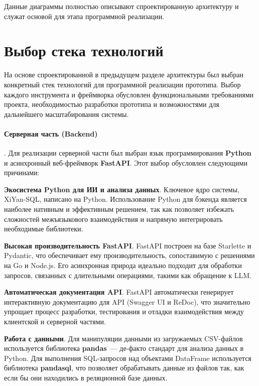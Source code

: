 Данные диаграммы полностью описывают спроектированную архитектуру и
служат основой для этапа программной реализации.




\section{Выбор стека технологий}

На основе спроектированной в предыдущем разделе архитектуры был выбран конкретный стек
технологий для программной реализации прототипа. Выбор каждого инструмента и фреймворка
обусловлен функциональными требованиями проекта, необходимостью разработки прототипа и
возможностями для дальнейшего масштабирования системы.

\paragraph{Серверная часть (Backend)}. Для реализации серверной части был выбран язык
программирования \textbf{Python} и асинхронный веб-фреймворк \textbf{FastAPI}.
Этот выбор обусловлен следующими причинами:
\begin{compactitem}
      \item \textbf{Экосистема Python для ИИ и анализа данных}. Ключевое ядро системы,
      XiYan-SQL, написано на Python. Использование Python для бэкенда является наиболее
      нативным и эффективным решением, так как позволяет избежать сложностей межъязыкового
      взаимодействия и напрямую интегрировать необходимые библиотеки.
      \item \textbf{Высокая производительность FastAPI}. FastAPI построен на базе Starlette и Pydantic,
      что обеспечивает ему производительность, сопоставимую с решениями на Go и Node.js.
      Его асинхронная природа идеально подходит для обработки запросов, связанных с
      длительными операциями, такими как обращение к LLM.
      \item \textbf{Автоматическая документация API}. FastAPI автоматически генерирует
      интерактивную документацию для API (Swagger UI и ReDoc), что значительно упрощает
      процесс разработки, тестирования и отладки взаимодействия между клиентской и серверной частями.
      \item \textbf{Работа с данными}. Для манипуляции данными из загружаемых
      CSV-файлов используется библиотека \textbf{pandas}~--- де-факто стандарт для
      анализа данных в Python. Для выполнения SQL-запросов над объектами DataFrame
      используется библиотека \textbf{pandasql}, что позволяет обрабатывать данные из файлов так,
      как если бы они находились в реляционной базе данных.
\end{compactitem}

